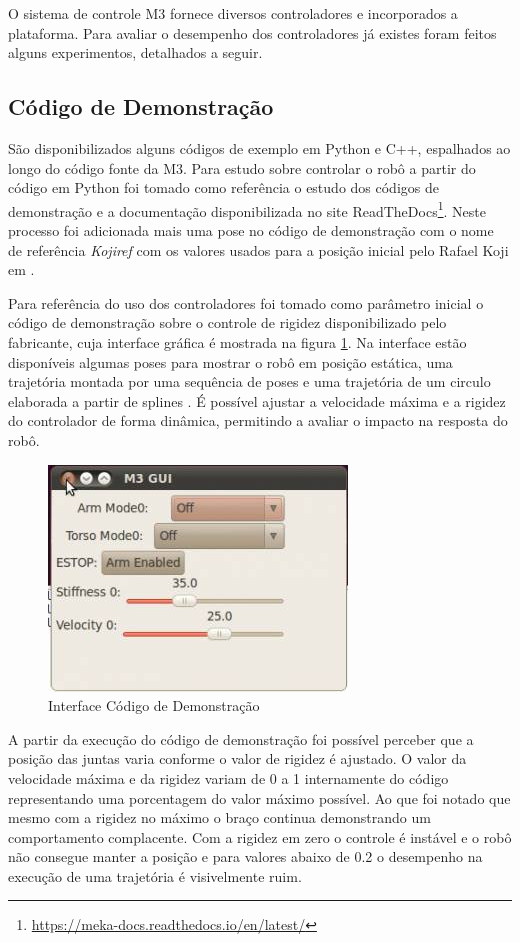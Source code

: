 O sistema de controle M3 fornece diversos controladores e incorporados a plataforma. Para avaliar o desempenho dos controladores já existes foram feitos alguns experimentos, detalhados a seguir.

\subsection{Código de Demonstração}

São disponibilizados alguns códigos de exemplo em Python e C++, espalhados ao longo do código fonte da M3. Para estudo sobre controlar o robô a partir do código em Python foi tomado como referência o estudo dos códigos de demonstração e a documentação disponibilizada no site ReadTheDocs\footnote{\url{https://meka-docs.readthedocs.io/en/latest/}}. Neste processo foi adicionada mais uma pose no código de demonstração com o nome de referência \textit{Kojiref} com os valores usados para a posição inicial pelo Rafael Koji em \cite{koji2017}.

Para referência do uso dos controladores foi tomado como parâmetro inicial o código de demonstração sobre o controle de rigidez disponibilizado pelo fabricante, cuja interface gráfica é mostrada na figura \ref{fig:m3demo}. Na interface estão disponíveis algumas poses para mostrar o robô em posição estática, uma trajetória montada por uma sequência de poses e uma trajetória de um circulo elaborada a partir de splines \cite{nobody}. É possível ajustar a velocidade máxima e a rigidez do controlador de forma dinâmica, permitindo a avaliar o impacto na resposta do robô.

\begin{figure}[H]
    \centering
    \includegraphics[width=0.5\linewidth]{tex/figs/mekademo.png}
    \caption{Interface Código de Demonstração \cite{mekaguide}}
    \label{fig:m3demo}
\end{figure}

A partir da execução do código de demonstração foi possível perceber que a posição das juntas varia conforme o valor de rigidez é ajustado. O valor da velocidade máxima e da rigidez variam de 0 a 1 internamente do código representando uma porcentagem do valor máximo possível. Ao que foi notado que mesmo com a rigidez no máximo o braço continua demonstrando um comportamento complacente. Com a rigidez em zero o controle é instável e o robô não consegue manter a posição e para valores abaixo de 0.2 o desempenho na execução de uma trajetória é visivelmente ruim.

